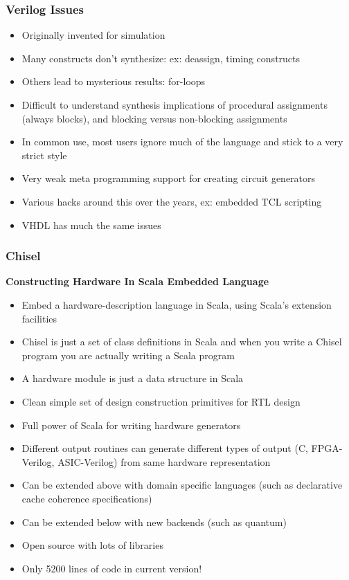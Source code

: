 \documentclass[xcolor=pdflatex,dvipsnames,table]{beamer}
\begin{document}
\begin{frame}

\frametitle{Verilog Issues}
\begin{itemize}
\item Originally invented for simulation
\item Many constructs don't synthesize: ex: deassign, timing constructs
\item Others lead to mysterious results: for-loops
\item Difficult to understand synthesis implications of procedural assignments (always blocks), and blocking versus non-blocking assignments
\item In common use, most users ignore much of the language and stick to a very strict style
\item Very weak meta programming support for creating circuit generators
\item Various hacks around this over the years, ex: embedded TCL scripting
\item VHDL has much the same issues
\end{itemize}

\end{frame}

\begin{frame}

\frametitle{Chisel}

\textbf{Constructing Hardware In Scala Embedded Language}
\begin{itemize}
\item Embed a hardware-description language in Scala, using Scala's extension facilities
\item Chisel is just a set of class definitions in Scala and when you write a Chisel program you are actually writing a Scala program
\item A hardware module is just a data structure in Scala
\item Clean simple set of design construction primitives for RTL design
\item Full power of Scala for writing hardware generators
\item Different output routines can generate different types of output (C, FPGA-Verilog, ASIC-Verilog) from same hardware representation
\item Can be extended above with domain specific languages (such as declarative cache coherence specifications)
\item Can be extended below with new backends (such as quantum)
\item Open source with lots of libraries
\item Only 5200 lines of code in current version!
\end{itemize}

\end{frame}
\end{document}
